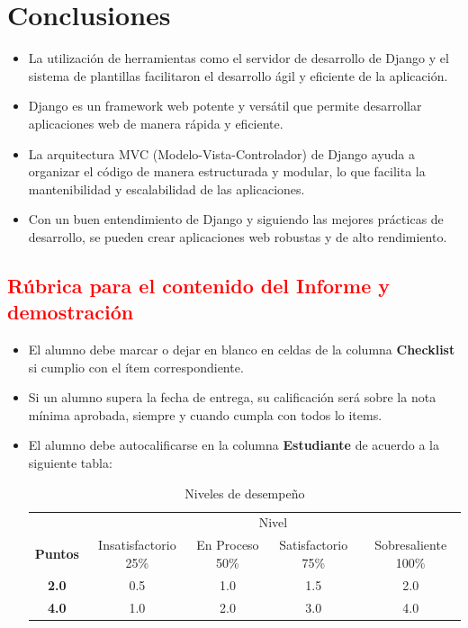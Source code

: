 \documentclass{article}
\begin{document}

  \section{Conclusiones}
  \begin{itemize}
    \item La utilización de herramientas como el servidor de desarrollo de Django y el sistema de plantillas facilitaron 
    el desarrollo ágil y eficiente de la aplicación.
    \item Django es un framework web potente y versátil que permite desarrollar aplicaciones web de manera rápida y eficiente.
    \item La arquitectura MVC (Modelo-Vista-Controlador) de Django ayuda a organizar el código de manera estructurada y modular, 
    lo que facilita la mantenibilidad y escalabilidad de las aplicaciones.
    \item Con un buen entendimiento de Django y siguiendo las mejores prácticas de desarrollo, se pueden crear aplicaciones web 
    robustas y de alto rendimiento.
  \end{itemize}
  
	\newpage
	\subsection{\textcolor{red}{Rúbrica para el contenido del Informe y demostración}}
	\begin{itemize}			
		\item El alumno debe marcar o dejar en blanco en celdas de la columna \textbf{Checklist} si cumplio con el ítem correspondiente.
		\item Si un alumno supera la fecha de entrega,  su calificación será sobre la nota mínima aprobada, siempre y cuando cumpla con todos lo items.
		\item El alumno debe autocalificarse en la columna \textbf{Estudiante} de acuerdo a la siguiente tabla:
	
		\begin{table}[ht]
			\caption{Niveles de desempeño}
			\begin{center}
			\begin{tabular}{ccccc}
    			\hline
    			 & \multicolumn{4}{c}{Nivel}\\
    			\cline{1-5}
    			\textbf{Puntos} & Insatisfactorio 25\%& En Proceso 50\% & Satisfactorio 75\% & Sobresaliente 100\%\\
    			\textbf{2.0}&0.5&1.0&1.5&2.0\\
    			\textbf{4.0}&1.0&2.0&3.0&4.0\\
    		\hline
			\end{tabular}
		\end{center}
	\end{table}	
	

	\end{itemize}
\end{document}
